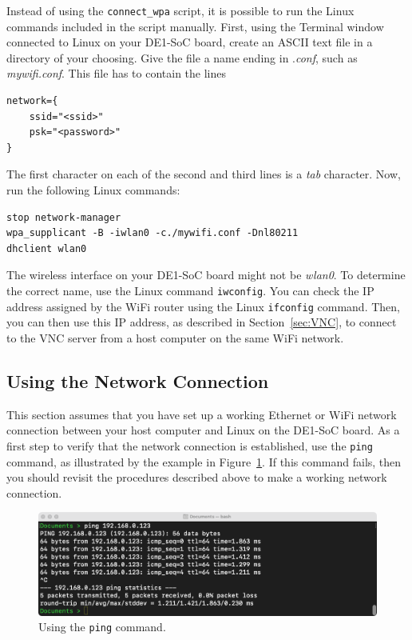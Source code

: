 \documentclass[11pt, twoside, pdftex]{article}
\begin{document}
Instead of using the \texttt{connect\_wpa} script, it is possible to run the Linux commands
included in the script manually. First, using the Terminal window connected to Linux on
your DE1-SoC board, create an ASCII text file in a directory of your choosing. Give the file 
a name ending in .{\it conf}, such as {\it mywifi.conf}. This file has to contain the lines

\begin{lstlisting}
network={
	ssid="<ssid>"
	psk="<password>"
}
\end{lstlisting}

The first character on each of the second and third lines is a {\it tab} character.
Now, run the following Linux commands:

\begin{lstlisting}
stop network-manager
wpa_supplicant -B -iwlan0 -c./mywifi.conf -Dnl80211
dhclient wlan0
\end{lstlisting}

The wireless interface on your DE1-SoC board might not be {\it wlan0}. To
determine the correct name, use the Linux command \texttt{iwconfig}. You can check the IP address 
assigned by the WiFi router using the Linux \texttt{ifconfig} command. Then, you can then use 
this IP address, as described in Section~\ref{sec:VNC}, to connect to the VNC server from a 
host computer on the same WiFi network.

\subsection{Using the Network Connection}
\label{sec:connecting}

This section assumes that you have set up a working Ethernet or WiFi network connection 
between your host computer and Linux on the DE1-SoC board.  As a first step to verify that
the network connection is established, use the \texttt{ping} command, as illustrated by the
example in Figure~\ref{fig:ping}. If this command fails, then you should revisit the procedures
described above to make a working network connection.

\begin{figure}[H]
   \begin{center}
       \includegraphics[scale=0.4]{figures/ping.png}
   \end{center}
   \caption{Using the \texttt{ping} command.}
	\label{fig:ping}
\end{figure}
\end{document}
